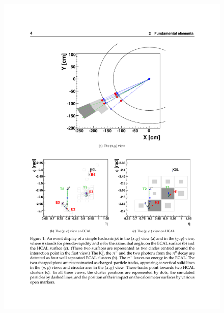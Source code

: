 \begin{figure}[hbtp]
  \begin{center}
    \includegraphics[width=1.0\cmsFigWidth]{figures/cms-pflow-a}

\end{center}
\end{figure}
